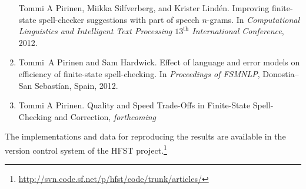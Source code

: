 \documentclass[officiallayout,final]{unihelcompling}
\newcommand\misspelt{\bgroup\markoverwith
{\lower3.5pt\hbox{\sixly \char58}}\ULon}
\newcommand\misspelt{\bgroup\markoverwith
{\textcolor{red}{\lower3.5pt\hbox{\sixly \char58}}}\ULon}
\begin{document}
\begin{enumerate}
        Tommi A Pirinen, Miikka Silfverberg, and Krister Lindén.
        \newblock Improving finite-state spell-checker suggestions with part of
        speech \(n\)-grams.
        \newblock In {\em Computational Linguistics and Intelligent Text
        Processing $13^{\mathrm{th}}$ International Conference}, 2012.
    \item[\citetalias{pirinen2012effects}]
        Tommi~A Pirinen and Sam Hardwick.
        \newblock Effect of language and error models on
        efficiency of finite-state spell-checking.
        \newblock In {\em Proceedings of FSMNLP}, Donostia--San Sebastían, Spain, 2012.
    \item[\citetalias{pirinen2013quality}]
        Tommi A Pirinen.
        \newblock Quality and Speed Trade-Offs in
        Finite-State Spell-Checking and Correction, {\em forthcoming}
\end{enumerate}

The implementations and data for reproducing the results are available
in the version control system of the HFST
project.\footnote{\url{http://svn.code.sf.net/p/hfst/code/trunk/articles/}}

\tableofcontents

\listoftables

\listoffigures

\listoftodos













\end{document}
